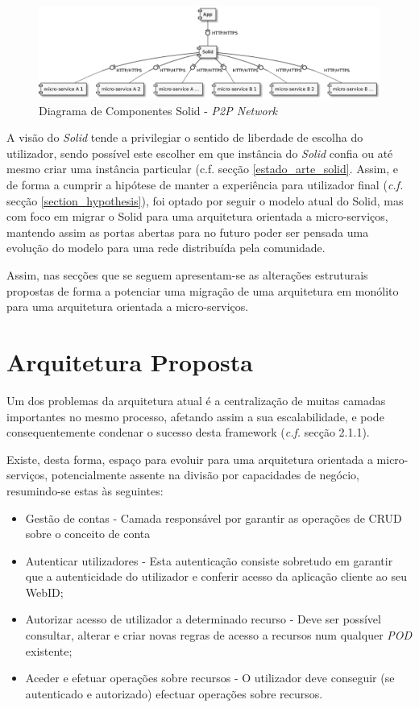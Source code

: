 \begin{figure}[H]
    \begin{center}
    \includegraphics[width=1 \textwidth]{figures/solid_web2.eps}
    \caption{Diagrama de Componentes Solid - \emph{P2P Network}}
    \label{figure_solid_p2p_network}
    \end{center}
\end{figure}

A visão do \emph{Solid} tende a privilegiar o sentido de liberdade de escolha do utilizador, sendo possível este escolher em que instância do \emph{Solid} confia ou até mesmo criar uma instância particular ({c.f. secção \ref{estado_arte_solid}}. Assim, e 
de forma a cumprir a hipótese de manter a experiência para utilizador final (\emph{c.f.} secção \ref{section_hypothesis}), foi optado por seguir o modelo atual do Solid, mas com foco em migrar o Solid para uma arquitetura orientada a micro-serviços, mantendo assim as portas abertas para no futuro poder ser pensada uma evolução do modelo para uma rede distribuída pela comunidade.

Assim, nas secções que se seguem apresentam-se as alterações estruturais propostas de forma a potenciar uma migração de uma arquitetura em monólito para uma arquitetura orientada a micro-serviços.

\section{Arquitetura Proposta \label{section_arquitetura_proposta}}
Um dos problemas da arquitetura atual é a centralização de muitas camadas importantes no mesmo processo, afetando assim a sua escalabilidade, e pode consequentemente condenar o sucesso desta framework (\emph{c.f.} secção 2.1.1).

Existe, desta forma, espaço para evoluir para uma arquitetura orientada a micro-serviços, potencialmente assente na divisão por capacidades de negócio, resumindo-se estas às seguintes:
\begin{itemize}
    \item Gestão de contas - Camada responsável por garantir as operações de CRUD sobre o conceito de conta
    \item  Autenticar utilizadores - Esta autenticação consiste sobretudo em garantir que a autenticidade do utilizador e conferir acesso da aplicação cliente ao seu WebID;
    \item Autorizar acesso de utilizador a determinado recurso - Deve ser possível consultar, alterar e criar novas regras de acesso a recursos num qualquer \emph{\acrshort{POD}} existente;
    \item Aceder e efetuar operações sobre recursos - O utilizador deve conseguir (se autenticado e autorizado) efectuar operações sobre recursos.
\end{itemize}

